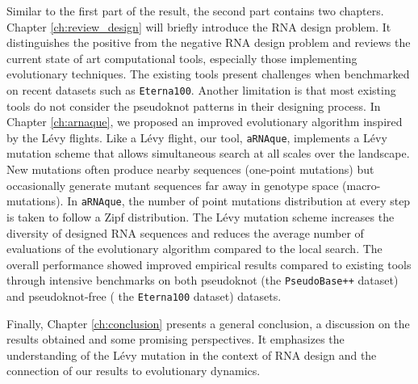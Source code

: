 Similar to the first part of the result, the second part contains two chapters. Chapter \ref{ch:review_design} will briefly introduce the RNA design problem. It distinguishes the positive from the negative RNA design problem and reviews the current state of art computational tools, especially those implementing evolutionary techniques. The existing tools present challenges when benchmarked on recent datasets such as \texttt{Eterna100}. Another limitation is that most existing tools do not consider the pseudoknot patterns in their designing process. In Chapter \ref{ch:arnaque}, we proposed an improved evolutionary algorithm inspired by the Lévy flights. Like a Lévy flight, our tool, \texttt{aRNAque}, implements a Lévy mutation scheme that allows simultaneous search at all scales over the landscape. New mutations often produce nearby sequences (one-point mutations) but occasionally generate mutant sequences far away in genotype space (macro-mutations). In \texttt{aRNAque}, the number of point mutations distribution at every step is taken to follow a Zipf distribution. The Lévy mutation scheme increases the diversity of designed RNA sequences and reduces the average number of evaluations of the evolutionary algorithm compared to the local search. The overall performance showed improved empirical results compared to existing tools through intensive benchmarks on both pseudoknot (the \texttt{PseudoBase++} dataset) and pseudoknot-free ( the \texttt{Eterna100} dataset) datasets. 

Finally, Chapter \ref{ch:conclusion} presents a general conclusion, a discussion on the results obtained and some promising perspectives. It emphasizes the understanding of the Lévy mutation in the context of RNA design and the connection of our results to evolutionary dynamics. 
